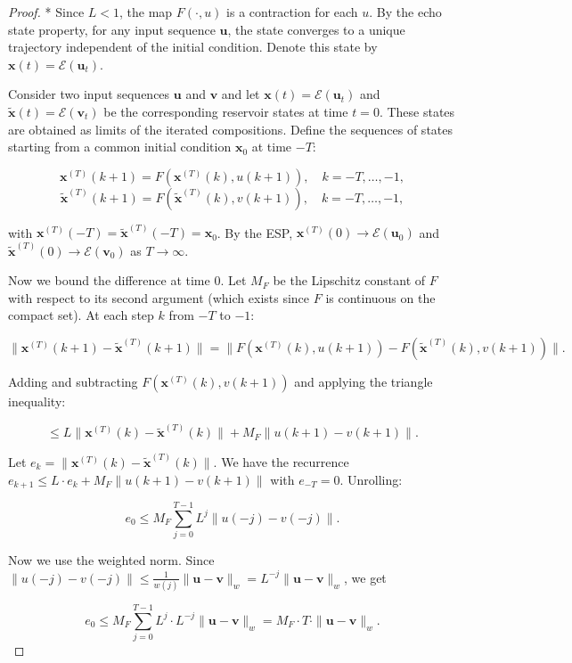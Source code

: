 \begin{proof}
* Since $L < 1$, the map $F(\cdot, u)$ is a contraction for each $u$. By the
echo state property, for any input sequence $\mathbf{u}$, the state converges to a
unique trajectory independent of the initial condition. Denote this state by
$\mathbf{x}(t) = \mathcal{E}(\mathbf{u}_t)$.

Consider two input sequences $\mathbf{u}$ and $\mathbf{v}$ and let
$\mathbf{x}(t) = \mathcal{E}(\mathbf{u}_t)$ and $\tilde{\mathbf{x}}(t) = \mathcal{E}(\mathbf{v}_t)$
be the corresponding reservoir states at time $t = 0$. These states are obtained as
limits of the iterated compositions. Define the sequences of states starting from a
common initial condition $\mathbf{x}_0$ at time $-T$:

\[
\mathbf{x}^{(T)}(k+1) = F(\mathbf{x}^{(T)}(k), u(k+1)), \quad k = -T, \ldots, -1,
\]
\[
\tilde{\mathbf{x}}^{(T)}(k+1) = F(\tilde{\mathbf{x}}^{(T)}(k), v(k+1)), \quad k = -T, \ldots, -1,
\]

with $\mathbf{x}^{(T)}(-T) = \tilde{\mathbf{x}}^{(T)}(-T) = \mathbf{x}_0$. By the ESP,
$\mathbf{x}^{(T)}(0) \to \mathcal{E}(\mathbf{u}_0)$ and
$\tilde{\mathbf{x}}^{(T)}(0) \to \mathcal{E}(\mathbf{v}_0)$ as $T \to \infty$.

Now we bound the difference at time $0$. Let $M_F$ be the Lipschitz constant of $F$
with respect to its second argument (which exists since $F$ is continuous on the
compact set). At each step $k$ from $-T$ to $-1$:

\[
\|\mathbf{x}^{(T)}(k+1) - \tilde{\mathbf{x}}^{(T)}(k+1)\| = \|F(\mathbf{x}^{(T)}(k), u(k+1)) - F(\tilde{\mathbf{x}}^{(T)}(k), v(k+1))\|.
\]

Adding and subtracting $F(\mathbf{x}^{(T)}(k), v(k+1))$ and applying the triangle
inequality:

\[
\leq L\|\mathbf{x}^{(T)}(k) - \tilde{\mathbf{x}}^{(T)}(k)\| + M_F\|u(k+1) - v(k+1)\|.
\]

Let $e_k = \|\mathbf{x}^{(T)}(k) - \tilde{\mathbf{x}}^{(T)}(k)\|$. We have the recurrence
$e_{k+1} \leq L \cdot e_k + M_F \|u(k+1) - v(k+1)\|$ with $e_{-T} = 0$. Unrolling:

\[
e_0 \leq M_F \sum_{j=0}^{T-1} L^j \|u(-j) - v(-j)\|.
\]

Now we use the weighted norm. Since $\|u(-j) - v(-j)\| \leq \frac{1}{w(j)}\|\mathbf{u} - \mathbf{v}\|_w = L^{-j}\|\mathbf{u} - \mathbf{v}\|_w$, we get

\[
e_0 \leq M_F \sum_{j=0}^{T-1} L^j \cdot L^{-j} \|\mathbf{u} - \mathbf{v}\|_w = M_F \cdot T \cdot \|\mathbf{u} - \mathbf{v}\|_w.
\]


\end{proof}
